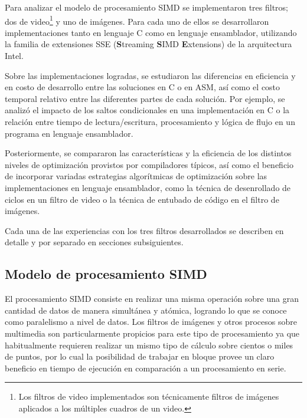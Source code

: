

Para analizar el modelo de procesamiento SIMD se implementaron tres filtros; dos de video\footnote{Los filtros de video implementados son técnicamente filtros de imágenes aplicados a los múltiples cuadros de un video.} y uno de imágenes. Para cada uno de ellos se desarrollaron implementaciones tanto en lenguaje C como en lenguaje ensamblador, utilizando la familia de extensiones SSE (\textbf{S}treaming \textbf{S}IMD \textbf{E}xtensions) de la arquitectura Intel.

Sobre las implementaciones logradas, se estudiaron las diferencias en eficiencia y en costo de desarrollo entre las soluciones en C o en ASM, así como el costo temporal relativo entre las diferentes partes de cada solución. Por ejemplo, se analizó el impacto de los saltos condicionales en una implementación en C o la relación entre tiempo de lectura/escritura, procesamiento y lógica de flujo en un programa en lenguaje ensamblador.

Posteriormente, se compararon las características y la eficiencia de los distintos niveles de optimización provistos por compiladores típicos, así como el beneficio de incorporar variadas estrategias algorítmicas de optimización sobre las implementaciones en lenguaje ensamblador, como la técnica de desenrollado de ciclos en un filtro de video o la técnica de entubado de código en el filtro de imágenes.

Cada una de las experiencias con los tres filtros desarrollados se describen en detalle y por separado en secciones subsiguientes.

\subsection{Modelo de procesamiento SIMD}

	El procesamiento SIMD consiste en realizar una misma operación sobre una gran cantidad de datos de manera simultánea y atómica, logrando lo que se conoce como paralelismo a nivel de datos. Los filtros de imágenes y otros procesos sobre multimedia son particularmente propicios para este tipo de procesamiento ya que habitualmente requieren realizar un mismo tipo de cálculo sobre cientos o miles de puntos, por lo cual la posibilidad de trabajar en bloque provee un claro beneficio en tiempo de ejecución en comparación a un procesamiento en serie.

